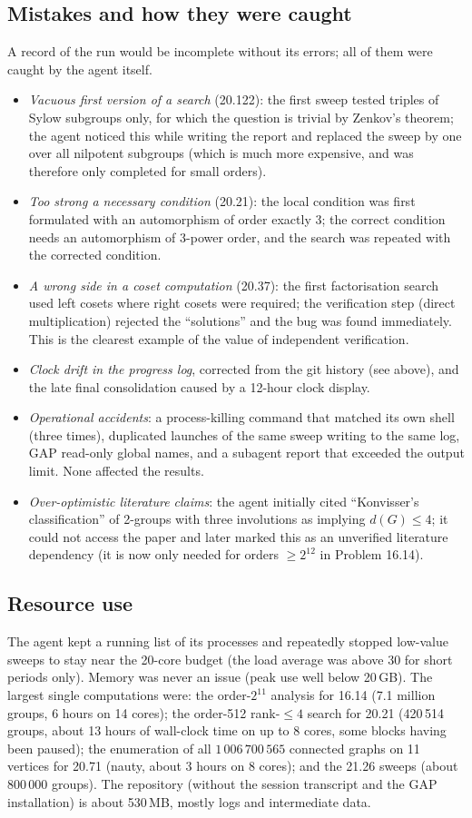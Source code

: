 \subsection{Mistakes and how they were caught}
A record of the run would be incomplete without its errors; all of them were caught by the agent itself.
\begin{itemize}
\item \emph{Vacuous first version of a search} (20.122): the first sweep tested triples of Sylow subgroups only,
for which the question is trivial by Zenkov's theorem; the agent noticed this while writing the report and
replaced the sweep by one over all nilpotent subgroups (which is much more expensive, and was therefore only
completed for small orders).
\item \emph{Too strong a necessary condition} (20.21): the local condition was first formulated with an
automorphism of order exactly 3; the correct condition needs an automorphism of 3-power order, and the search was
repeated with the corrected condition.
\item \emph{A wrong side in a coset computation} (20.37): the first factorisation search used left cosets where
right cosets were required; the verification step (direct multiplication) rejected the ``solutions'' and the bug
was found immediately. This is the clearest example of the value of independent verification.
\item \emph{Clock drift in the progress log}, corrected from the git history (see above), and the late final
consolidation caused by a 12-hour clock display.
\item \emph{Operational accidents}: a process-killing command that matched its own shell (three times), duplicated
launches of the same sweep writing to the same log, GAP read-only global names, and a subagent report that exceeded
the output limit. None affected the results.
\item \emph{Over-optimistic literature claims}: the agent initially cited ``Konvisser's classification'' of
2-groups with three involutions as implying $d(G)\le 4$; it could not access the paper and later marked this as an
unverified literature dependency (it is now only needed for orders $\ge 2^{12}$ in Problem 16.14).
\end{itemize}

\subsection{Resource use}
The agent kept a running list of its processes and repeatedly stopped low-value sweeps to stay near the 20-core
budget (the load average was above 30 for short periods only). Memory was never an issue (peak use well below
20\,GB). The largest single computations were: the order-$2^{11}$ analysis for 16.14 (7.1 million groups, 6
hours on 14 cores); the order-512 rank-$\le 4$ search for 20.21 (420\,514 groups, about 13 hours of wall-clock time on up to 8 cores,
some blocks having been paused); the
enumeration of all $1\,006\,700\,565$ connected graphs on 11 vertices for 20.71 (nauty, about 3 hours on 8
cores); and the 21.26 sweeps (about 800\,000 groups). The repository (without the session transcript and the
GAP installation) is about 530\,MB, mostly logs and intermediate data.
